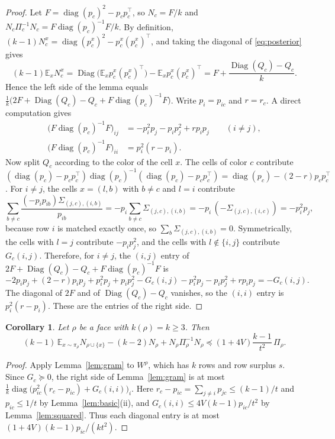 \documentclass{amsart}
\numberwithin{equation}{section}
\theoremstyle{plain}
\newtheorem{corollary}[theorem]{Corollary}
\theoremstyle{definition}
\theoremstyle{remark}
\newcommand{\E}{\mathbb{E}}
\newcommand{\diag}{\operatorname{diag}}
\newcommand{\Diag}{\operatorname{Diag}}
\newcommand{\T}{\top}
\begin{document}
\begin{proof}
Let $F=\diag(p_c)^2-p_cp_c^\T$, so $N_c=F/k$ and $N_c\Pi_c^{-1}N_c=F\diag(p_c)^{-1}F/k$. By definition, $(k-1)N^x_c=\diag(p^x_c)^2-p^x_c(p^x_c)^\T$, and taking the diagonal of \eqref{eq:posterior} gives
\[
(k-1)\E_xN^x_c=\Diag\bigl(\E_xp^x_c(p^x_c)^\T\bigr)-\E_xp^x_c(p^x_c)^\T=F+\frac{\Diag(Q_c)-Q_c}{k}.
\]
Hence the left side of the lemma equals $\frac1k\bigl(2F+\Diag(Q_c)-Q_c+F\diag(p_c)^{-1}F\bigr)$. Write $p_i=p_{ic}$ and $r=r_c$. A direct computation gives
\begin{align*}
\bigl(F\diag(p_c)^{-1}F\bigr)_{ij}&=-p_i^2p_j-p_ip_j^2+rp_ip_j\qquad(i\ne j),\\
\bigl(F\diag(p_c)^{-1}F\bigr)_{ii}&=p_i^2(r-p_i).
\end{align*}
Now split $Q_c$ according to the color of the cell $x$. The cells of color $c$ contribute $(\diag(p_c)-p_cp_c^\T)\diag(p_c)^{-1}(\diag(p_c)-p_cp_c^\T)=\diag(p_c)-(2-r)p_cp_c^\T$. For $i\ne j$, the cells $x=(l,b)$ with $b\ne c$ and $l=i$ contribute
\[
\sum_{b\ne c}\frac{(-p_ip_{ib})\Sigma_{(j,c),(i,b)}}{p_{ib}}=-p_i\sum_{b\ne c}\Sigma_{(j,c),(i,b)}=-p_i\,(-\Sigma_{(j,c),(i,c)})=-p_i^2p_j,
\]
because row $i$ is matched exactly once, so $\sum_b\Sigma_{(j,c),(i,b)}=0$. Symmetrically, the cells with $l=j$ contribute $-p_ip_j^2$, and the cells with $l\notin\{i,j\}$ contribute $G_c(i,j)$. Therefore, for $i\ne j$, the $(i,j)$ entry of $2F+\Diag(Q_c)-Q_c+F\diag(p_c)^{-1}F$ is
\[
-2p_ip_j+(2-r)p_ip_j+p_i^2p_j+p_ip_j^2-G_c(i,j)-p_i^2p_j-p_ip_j^2+rp_ip_j=-G_c(i,j).
\]
The diagonal of $2F$ and of $\Diag(Q_c)-Q_c$ vanishes, so the $(i,i)$ entry is $p_i^2(r-p_i)$. These are the entries of the right side.
\end{proof}

\begin{corollary}\label{cor:recursion}
Let $\rho$ be a face with $k(\rho)=k\ge3$. Then
\[
(k-1)\,\E_{x\sim\pi_\rho}N_{\rho\cup\{x\}}-(k-2)N_\rho+N_\rho\Pi_\rho^{-1}N_\rho\preceq(1+4V)\frac{k-1}{t^2}\,\Pi_\rho .
\]
\end{corollary}

\begin{proof}
Apply Lemma~\ref{lem:gram} to $W^\rho$, which has $k$ rows and row surplus $s$. Since $G_c\succeq0$, the right side of Lemma~\ref{lem:gram} is at most $\frac1k\diag\bigl(p_{ic}^2(r_c-p_{ic})+G_c(i,i)\bigr)_i$. Here $r_c-p_{ic}=\sum_{j\ne i}p_{jc}\le(k-1)/t$ and $p_{ic}\le1/t$ by Lemma~\ref{lem:basic}(ii), and $G_c(i,i)\le4V(k-1)p_{ic}/t^2$ by Lemma~\ref{lem:squared}. Thus each diagonal entry is at most $(1+4V)(k-1)p_{ic}/(kt^2)$.
\end{proof}
\end{document}
